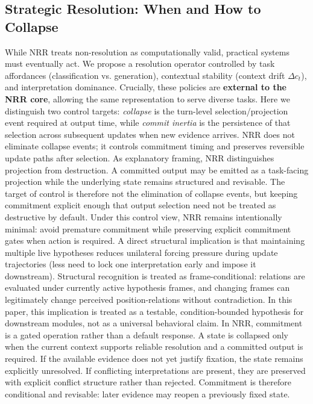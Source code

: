 \documentclass[11pt,a4paper]{article}
\begin{document}
\subsection{Strategic Resolution: When and How to Collapse}

While NRR treats non-resolution as computationally valid, practical systems must eventually act.
We propose a resolution operator controlled by task affordances (classification vs. generation), contextual stability (context drift $\Delta c_t$), and interpretation dominance.
Crucially, these policies are \textbf{external to the NRR core}, allowing the same representation to serve diverse tasks.
Here we distinguish two control targets: \emph{collapse} is the turn-level selection/projection event required at output time, while \emph{commit inertia} is the persistence of that selection across subsequent updates when new evidence arrives. NRR does not eliminate collapse events; it controls commitment timing and preserves reversible update paths after selection.
As explanatory framing, NRR distinguishes projection from destruction.
A committed output may be emitted as a task-facing projection while the underlying state remains structured and revisable.
The target of control is therefore not the elimination of collapse events, but keeping commitment explicit enough that output selection need not be treated as destructive by default.
Under this control view, NRR remains intentionally minimal: avoid premature commitment while preserving explicit commitment gates when action is required. A direct structural implication is that maintaining multiple live hypotheses reduces unilateral forcing pressure during update trajectories (less need to lock one interpretation early and impose it downstream). Structural recognition is treated as frame-conditional: relations are evaluated under currently active hypothesis frames, and changing frames can legitimately change perceived position-relations without contradiction. In this paper, this implication is treated as a testable, condition-bounded hypothesis for downstream modules, not as a universal behavioral claim.
In NRR, commitment is a gated operation rather than a default response.
A state is collapsed only when the current context supports reliable resolution and a committed output is required.
If the available evidence does not yet justify fixation, the state remains explicitly unresolved.
If conflicting interpretations are present, they are preserved with explicit conflict structure rather than rejected.
Commitment is therefore conditional and revisable: later evidence may reopen a previously fixed state.
\end{document}
